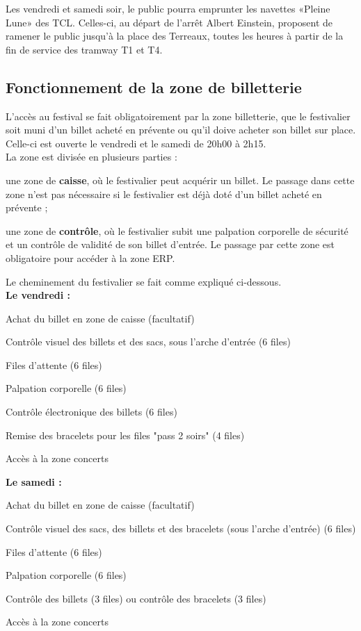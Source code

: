 \documentclass[hidelinks, paper=a4, fontsize=13pt]{report}
\begin{document}
Les vendredi et samedi soir, le public pourra emprunter les navettes «Pleine Lune» des TCL. Celles-ci, au départ de l’arrêt Albert Einstein, proposent de ramener le public jusqu’à la place des Terreaux, toutes les heures à partir de la fin de service des tramway T1 et T4.


\subsection{Fonctionnement de la zone de billetterie}

L’accès au festival se fait obligatoirement par la zone billetterie, que le festivalier soit muni d’un billet acheté en prévente ou qu'il doive acheter son billet sur place. Celle-ci est ouverte le vendredi et le samedi de 20h00 à 2h15.\\

La zone est divisée en plusieurs parties :
\begin{list}{•}{}
	\item une zone de \textbf{caisse}, où le festivalier peut acquérir un billet. Le passage dans cette zone n'est pas nécessaire si le festivalier est déjà doté d'un billet acheté en prévente ;
	\item une zone de \textbf{contrôle}, où le festivalier subit une palpation corporelle de sécurité et un contrôle de validité de son billet d'entrée. Le passage par cette zone est obligatoire pour accéder à la zone ERP.
\end{list}

Le cheminement du festivalier se fait comme expliqué ci-dessous.\\

\textbf{Le vendredi :}
\begin{list}{•}{}
	\item Achat du billet en zone de caisse (facultatif)
	\item Contrôle visuel des billets et des sacs, sous l'arche d'entrée (6 files)
	\item Files d’attente (6 files)
	\item Palpation corporelle (6 files)
	\item Contrôle électronique des billets (6 files)
	\item Remise des bracelets pour les files "pass 2 soirs" (4 files)
	\item Accès à la zone concerts
\end{list}

\textbf{Le samedi :}
\begin{list}{•}{}
	\item Achat du billet en zone de caisse (facultatif)
	\item Contrôle visuel des sacs, des billets et des bracelets (sous l'arche d'entrée) (6 files) 
	\item Files d’attente (6 files)
	\item Palpation corporelle (6 files)
	\item Contrôle des billets (3 files) ou contrôle des bracelets (3 files)
	\item Accès à la zone concerts
	
\end{list}
\end{document}
